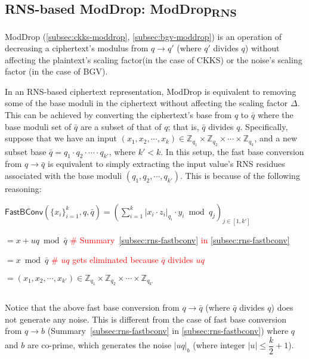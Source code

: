 \subsection{RNS-based ModDrop: \textsf{ModDrop\textsubscript{RNS}}}
\label{subsec:rns-moddrop}

\textsf{ModDrop} (\autoref{subsec:ckks-moddrop}, \autoref{subsec:bgv-moddrop}) is an operation of decreasing a ciphertext's modulus from $q \rightarrow q'$ (where $q'$ divides $q$) without affecting the plaintext's scaling factor(in the case of CKKS) or the noise's scaling factor (in the case of BGV). 

In an RNS-based ciphertext representation, \textsf{ModDrop} is equivalent to removing some of the base moduli in the ciphertext without affecting the scaling factor $\Delta$. This can be achieved by converting the ciphertext's base from $q$ to $\bar{q}$ where the base moduli set of $\bar{q}$ are a subset of that of $q$; that is, $\bar{q}$ divides $q$. Specifically, suppose that we have an input $(x_1, x_2, \cdots, x_k) \in \mathbb{Z}_{q_1} \times \mathbb{Z}_{q_2} \times \cdots \times \mathbb{Z}_{q_k}$, and a new subset base $\bar{q} = q_1 \cdot q_2 \cdot \cdots \cdot q_{k'}$, where $k' < k$. In this setup, the fast base conversion from $q \rightarrow \bar{q}$ is equivalent to simply extracting the input value's RNS residues associated with the base moduli $(q_1, q_2, \cdots, q_{k'})$. This is because of the following reasoning:

$\textsf{FastBConv}(\{x_i\}_{i=1}^{k}, q, \bar{q}) = \left( \sum\limits_{i=1}^{k} |x_i \cdot z_i|_{q_i} \cdot y_i \bmod q_j \right)_{j \in [1,k']}$  

$ = x + uq \bmod \bar{q}$ \textcolor{red}{ \# Summary~\ref*{subsec:rns-fastbconv} in \autoref{subsec:rns-fastbconv}}

$ = x \bmod \bar{q} $ \textcolor{red}{ \# $uq$ gets eliminated because $\bar{q}$ divides $uq$}


$ = (x_1, x_2, \cdots, x_{k'}) \in \mathbb{Z}_{q_1} \times \mathbb{Z}_{q_2} \times \cdots \times \mathbb{Z}_{q_{k'}}$ 


$ $

Notice that the above fast base conversion from $q \rightarrow \bar{q}$ (where $\bar{q}$ divides $q$) does not generate any noise. This is different from the case of fast base conversion from $q \rightarrow b$ (Summary~\ref*{subsec:rns-fastbconv} in \autoref{subsec:rns-fastbconv}) where $q$ and $b$ are co-prime, which generates the noise $|uq|_b$ (where integer $|u| \leq \dfrac{k}{2}+1$). 

